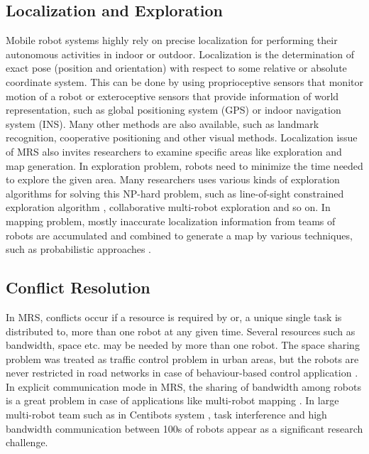 \subsection{Localization and Exploration}
Mobile robot systems highly rely on precise localization for performing their autonomous activities in indoor or outdoor. Localization is the determination of exact pose (position and orientation) with respect to some relative or absolute coordinate system. This can be done by using proprioceptive sensors that monitor motion of a robot or  exteroceptive sensors that provide information of world representation, such as global positioning system (GPS) or indoor navigation system (INS).   Many other methods are also available, such as landmark recognition, cooperative positioning and other visual methods.
Localization issue of MRS also invites researchers to examine specific areas like exploration and map generation. In exploration problem, robots need to minimize the time needed to explore the given area. Many researchers uses various kinds of exploration algorithms for solving this NP-hard problem, such as line-of-sight constrained exploration algorithm \cite{Arkin+2002}, collaborative multi-robot exploration \cite{Burgard+2000} and so on. In mapping problem, mostly inaccurate localization information from teams of robots are accumulated and combined to generate a map by various techniques, such as probabilistic approaches \cite{Thurn+2000}.


\subsection*{Conflict Resolution}
In MRS,  conflicts occur if a resource is required by or, a unique single task is distributed to, more than one robot at any given time. Several resources such as bandwidth, space etc. may be needed by more than one robot. The space sharing problem was treated as traffic control problem in urban areas, but the robots are never restricted in road networks in case of behaviour-based control application \cite{Cao+1997}. In explicit communication mode in MRS, the sharing of bandwidth among robots is a great problem in case of applications like multi-robot mapping \cite{Konolige+2003}. In large multi-robot team such as in Centibots system \cite{Ortiz+2005},  task interference and high bandwidth communication  between 100s of robots appear as a significant research challenge.

